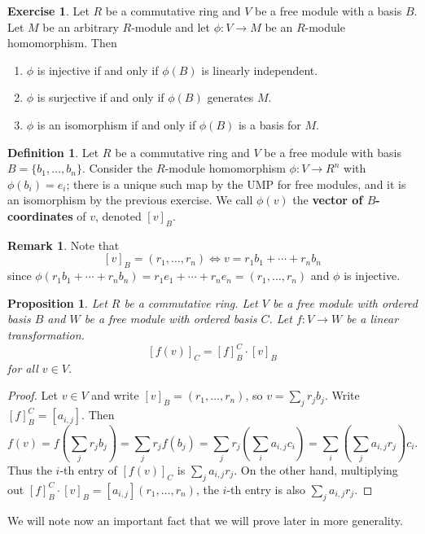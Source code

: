 \documentclass[12pt]{report}
\newtheorem{proposition}[theorem]{Proposition}
\numberwithin{equation}{section}
\numberwithin{theorem}{chapter}
\theoremstyle{definition}
\newtheorem{definition}[theorem]{Definition}
\newtheorem{exercise}{Exercise}
\newtheorem*{basic properties}{Basic Properties}
\newtheorem*{Important Remark}{Important Remark}
\newtheorem{remark}[theorem]{Remark}
\newcommand{\df}[1]{{\bf #1}\index{#1}}
\begin{document}
 \begin{exercise} Let $R$ be a commutative ring and $V$ be a free module with a basis $B$. Let $M$ be an arbitrary $R$-module and let $\phi: V\to M$ be an $R$-module homomorphism. Then
 \begin{enumerate}
 \item $\phi$ is injective if and only if $\phi(B)$ is linearly independent.
 \item $\phi$ is surjective if and only if $\phi(B)$ generates $M$.
 \item $\phi$ is an isomorphism if and only if $\phi(B)$ is a basis for $M$.
 \end{enumerate}
 \end{exercise}
 
 \begin{definition} Let $R$ be a commutative ring and $V$ be a free module with basis $B=\{b_1,\dots,b_n\}$. Consider the $R$-module homomorphism $\phi:V\to R^n$ with $\phi(b_i) = e_i$; there is a unique such map by the UMP for free modules, and it is an isomorphism by the previous exercise. We call $\phi(v)$ the \df{vector of $B$-coordinates} of $v$, denoted $[v]_B$.
 \end{definition}
 
\begin{remark} Note that 
\[ [v]_B = (r_1,\dots,r_n) \Leftrightarrow v= r_1 b_1+ \cdots +r_n b_n\]
since $\phi(r_1 b_1 + \cdots + r_n b_n) = r_1 e_1 + \cdots + r_n e_n = (r_1,\dots,r_n)$ and $\phi$ is injective.
\end{remark}

\begin{proposition}
Let $R$ be a commutative ring. Let $V$ be a free module with ordered basis $B$ and $W$ be a free module with ordered basis $C$. Let $f:V\to W$ be a linear transformation.
\[ [f(v)]_C = [f]_B^C \cdot [v]_B\]
for all $v\in V$.
\end{proposition}
\begin{proof}
Let $v\in V$ and write $[v]_B = (r_1,\dots,r_n)$, so $v=\sum_j r_j b_j$. Write $[f]_B^C=[a_{i,j}]$. Then 
\[ f(v) = f(\sum_j r_j b_j) = \sum_j r_j f(b_j) = \sum_j r_j (\sum_i a_{i,j} c_i) = \sum_i (\sum_j a_{i,j} r_j) c_i.\]
Thus the $i$-th entry of $[f(v)]_C$ is $\sum_j a_{i,j} r_j$. On the other hand, multiplying out $[f]_B^C \cdot [v]_B = [a_{i,j}] (r_1,\dots,r_n)$, the $i$-th entry is also $\sum_j a_{i,j} r_j$. 
\end{proof}

We will note now an important fact that we will prove later in more generality.
\end{document}

